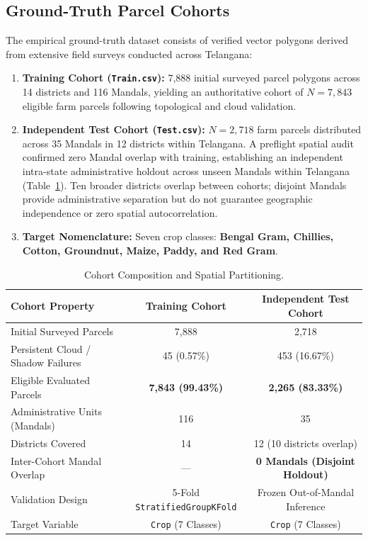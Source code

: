 \documentclass[runningheads]{llncs}
\begin{document}
\subsection{Ground-Truth Parcel Cohorts}
The empirical ground-truth dataset consists of verified vector polygons derived from extensive field surveys conducted across Telangana:
\begin{enumerate}
    \item \textbf{Training Cohort (\texttt{Train.csv}):} 7,888 initial surveyed parcel polygons across 14 districts and 116 Mandals, yielding an authoritative cohort of $N = 7{,}843$ eligible farm parcels following topological and cloud validation.
    \item \textbf{Independent Test Cohort (\texttt{Test.csv}):} $N = 2{,}718$ farm parcels distributed across 35 Mandals in 12 districts within Telangana. A preflight spatial audit confirmed zero Mandal overlap with training, establishing an independent intra-state administrative holdout across unseen Mandals within Telangana (Table~\ref{tab:cohort}). Ten broader districts overlap between cohorts; disjoint Mandals provide administrative separation but do not guarantee geographic independence or zero spatial autocorrelation.
    \item \textbf{Target Nomenclature:} Seven crop classes: \textbf{Bengal Gram, Chillies, Cotton, Groundnut, Maize, Paddy, and Red Gram}.
\end{enumerate}

\begin{table}[t]
\centering
\caption{Cohort Composition and Spatial Partitioning.}
\label{tab:cohort}
\small
\begin{tabular}{lcc}
\toprule
\textbf{Cohort Property} & \textbf{Training Cohort} & \textbf{Independent Test Cohort} \\
\midrule
Initial Surveyed Parcels & 7,888 & 2,718 \\
Persistent Cloud / Shadow Failures & 45 (0.57\%) & 453 (16.67\%) \\
Eligible Evaluated Parcels & \textbf{7,843 (99.43\%)} & \textbf{2,265 (83.33\%)} \\
Administrative Units (Mandals) & 116 & 35 \\
Districts Covered & 14 & 12 (10 districts overlap) \\
Inter-Cohort Mandal Overlap & — & \textbf{0 Mandals (Disjoint Holdout)} \\
Validation Design & 5-Fold \texttt{StratifiedGroupKFold} & Frozen Out-of-Mandal Inference \\
Target Variable & \texttt{Crop} (7 Classes) & \texttt{Crop} (7 Classes) \\
\bottomrule
\end{tabular}
\end{table}
\end{document}
